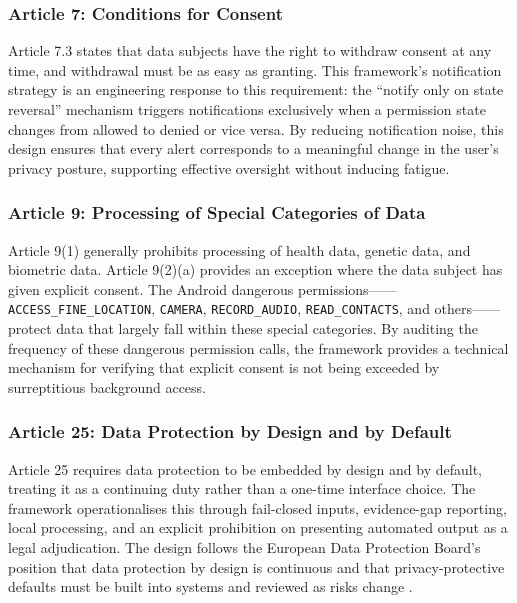 \subsubsection{Article 7: Conditions for Consent}

Article 7.3 states that data subjects have the right to withdraw consent at any time, and withdrawal must be as easy as granting. This framework's notification strategy is an engineering response to this requirement: the ``notify only on state reversal'' mechanism triggers notifications exclusively when a permission state changes from allowed to denied or vice versa. By reducing notification noise, this design ensures that every alert corresponds to a meaningful change in the user's privacy posture, supporting effective oversight without inducing fatigue.

\subsubsection{Article 9: Processing of Special Categories of Data}

Article 9(1) generally prohibits processing of health data, genetic data, and biometric data. Article 9(2)(a) provides an exception where the data subject has given explicit consent. The Android dangerous permissions——\texttt{ACCESS\_FINE\_LOCATION}, \texttt{CAMERA}, \texttt{RECORD\_AUDIO}, \texttt{READ\_CONTACTS}, and others——protect data that largely fall within these special categories. By auditing the frequency of these dangerous permission calls, the framework provides a technical mechanism for verifying that explicit consent is not being exceeded by surreptitious background access.

\subsubsection{Article 25: Data Protection by Design and by Default}

Article 25 requires data protection to be embedded by design and by default, treating it as a continuing duty rather than a one-time interface choice. The framework operationalises this through fail-closed inputs, evidence-gap reporting, local processing, and an explicit prohibition on presenting automated output as a legal adjudication. The design follows the European Data Protection Board's position that data protection by design is continuous and that privacy-protective defaults must be built into systems and reviewed as risks change \cite{edpb2019}.

